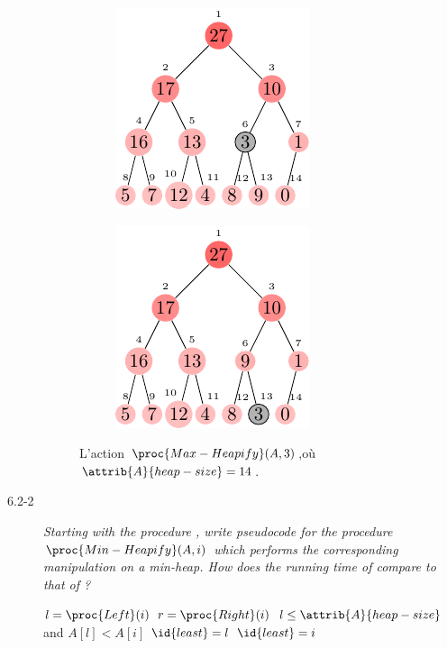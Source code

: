 \begin{description}
\begin{ex}
\begin{figure}[H]
        \begin{subfigure}[t]{.45\textwidth}
          \centering
          \includegraphics[scale=1.4]{img/6_2-1/6_2-1_2}
          \caption{}\label{fig:6_2-1_2}
        \end{subfigure}
        \begin{subfigure}[t]{.45\textwidth}
          \centering
          \includegraphics[scale=1.4]{img/6_2-1/6_2-1_3}
          \caption{}\label{fig:6_2-1_3}
        \end{subfigure}
        \caption{L'action $\proc{Max-Heapify}(A,3)$,o\`u $\attrib{A}{heap-size}= 14$.} 
        \label{fig:Heapify}
      \end{figure}
    \end{ex}
  \item[6.2-2] \textit{Starting with the procedure , write pseudocode for the procedure $\proc{Min-Heapify}(A,i)$ which performs the corresponding manipulation on a min-heap. How does the running time of  compare to that of  ?}
    \begin{ex}
      \begin{codebox}
        \li $l = \proc{Left}(i)$
        \li $r = \proc{Right}(i)$
        \li \If $l \le \attrib{A}{heap-size}$ and $A[l] < A[i]$ \Do
        \li $\id{least} = l$        
        \li \Else $\id{least} = i$ \End

\end{codebox}
\end{ex}
\end{description}
